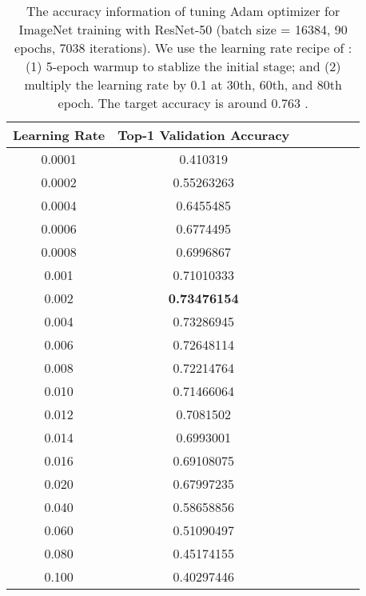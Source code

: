 \documentclass{article} \usepackage{iclr2020_conference,times}
\begin{document}
\begin{table}[ht]
\renewcommand{\arraystretch}{1.3}
\caption{The accuracy information of tuning Adam optimizer for ImageNet training with ResNet-50 (batch size = 16384, 90 epochs, 7038 iterations). We use the learning rate recipe of \citep{goyal2017accurate}: (1) 5-epoch warmup to stablize the initial stage; and (2) multiply the learning rate by 0.1 at 30th, 60th, and 80th epoch. The target accuracy is around 0.763 \citep{goyal2017accurate}.}
\centering
\begin{tabular}{|c|c|c|c|c|c|c|}
\hline
Learning Rate & Top-1 Validation Accuracy\\
\hline
\hline
0.0001 & 0.410319 \\
\hline
0.0002 & 0.55263263 \\
\hline
0.0004 & 0.6455485 \\
\hline
0.0006 & 0.6774495 \\
\hline
0.0008 & 0.6996867 \\
\hline
0.001 & 0.71010333 \\
\hline
0.002 & {\bf 0.73476154} \\
\hline
0.004 & 0.73286945 \\
\hline
0.006 & 0.72648114 \\
\hline
0.008 & 0.72214764 \\
\hline
0.010 & 0.71466064 \\
\hline
0.012 & 0.7081502 \\
\hline
0.014 & 0.6993001 \\
\hline
0.016 & 0.69108075 \\
\hline
0.020 & 0.67997235 \\
\hline
0.040 & 0.58658856 \\
\hline
0.060 & 0.51090497 \\
\hline
0.080 & 0.45174155 \\
\hline
0.100 & 0.40297446 \\
\hline
\end{tabular}
\label{table:imagenet_adam_tuning_2}
\end{table}
\end{document}

